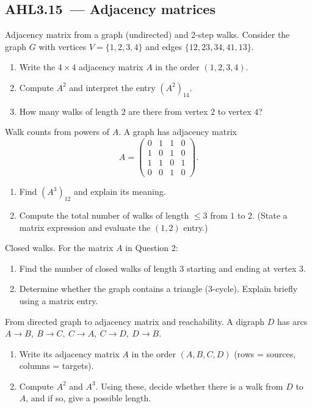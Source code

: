 \documentclass[11pt]{article}
\def\textbf#1{#1}%
\newcommand{\tocsubsection}[1]{\subsection{#1}}
\newcounter{question}
\begin{document}
\tocsubsection{AHL3.15 — Adjacency matrices}


\begin{question}
\textbf{Adjacency matrix from a graph (undirected) and 2-step walks.}
Consider the graph \(G\) with vertices \(V=\{1,2,3,4\}\) and edges
\(\{12,23,34,41,13\}\).
\begin{enumerate}
  \item Write the \(4\times4\) adjacency matrix \(A\) in the order \((1,2,3,4)\).
  \item Compute \(A^{2}\) and interpret the entry \((A^{2})_{14}\).
  \item How many walks of length \(2\) are there from vertex \(2\) to vertex \(4\)?
\end{enumerate}
\end{question}

\begin{question}
\textbf{Walk counts from powers of \(A\).}
A graph has adjacency matrix
\[
A=\begin{pmatrix}
0&1&1&0\\
1&0&1&0\\
1&1&0&1\\
0&0&1&0
\end{pmatrix}.
\]
\begin{enumerate}
  \item Find \((A^{3})_{12}\) and explain its meaning.
  \item Compute the total number of walks of length \(\le 3\) from \(1\) to \(2\).
        (State a matrix expression and evaluate the \((1,2)\) entry.)
\end{enumerate}
\end{question}

\begin{question}
\textbf{Closed walks.}
For the matrix \(A\) in Question 2:
\begin{enumerate}
  \item Find the number of closed walks of length \(3\) starting and ending at vertex \(3\).
  \item Determine whether the graph contains a triangle (3-cycle). Explain briefly using a matrix entry.
\end{enumerate}
\end{question}

\begin{question}
\textbf{From directed graph to adjacency matrix and reachability.}
A digraph \(D\) has arcs \(A\to B,\ B\to C,\ C\to A,\ C\to D,\ D\to B\).
\begin{enumerate}
  \item Write its adjacency matrix \(A\) in the order \((A,B,C,D)\) (rows = sources, columns = targets).
  \item Compute \(A^{2}\) and \(A^{3}\). Using these, decide whether there is a walk from \(D\) to \(A\), and if so, give a possible length.
\end{enumerate}
\end{question}
\end{document}
